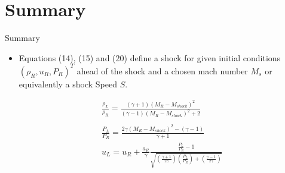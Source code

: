 \documentclass{beamer}
\begin{document}
\section*{Summary}

\begin{frame}{Summary}

  \begin{itemize}
  \item Equations \alert{(14)}, \alert{(15)} and \alert{(20)} define a shock for given initial conditions $(\rho_R,u_R,P_R)^T$ ahead of the shock and a chosen mach number $M_s$ or equivalently a shock Speed $S$.
  \end{itemize}
      \begin{eqnarray}
      && \frac{\rho_L}{\rho_R}=\frac{(\gamma+1)(M_R-M_{shock})^2}{(\gamma-1)(M_R-M_{shock})^2+2} \nonumber \\
      && \nonumber \\
      && \frac{P_L}{P_R}=\frac{2\gamma(M_R-M_{shock})^2-(\gamma-1)}{\gamma+1} \nonumber \\
      && u_L=u_R+\frac{a_R}{\gamma}\frac{\frac{P_L}{P_R}-1}{\sqrt{\left ( \frac{\gamma+1}{2\gamma} \right )\left ( \frac{P_L}{P_R} \right )+\left ( \frac{\gamma-1}{2\gamma} \right )}} \nonumber
    \end{eqnarray}
\end{frame}
\end{document}
